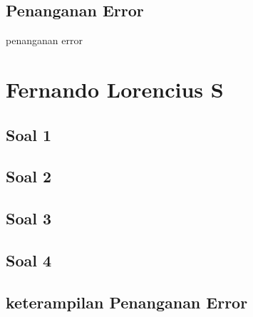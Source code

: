 \subsection{Penanganan Error}

\hfill \break

penanganan error


\section{Fernando Lorencius S}
\subsection{Soal 1}

\subsection{Soal 2}

\subsection{Soal 3}

\subsection{Soal 4}


\subsection{keterampilan Penanganan Error}


